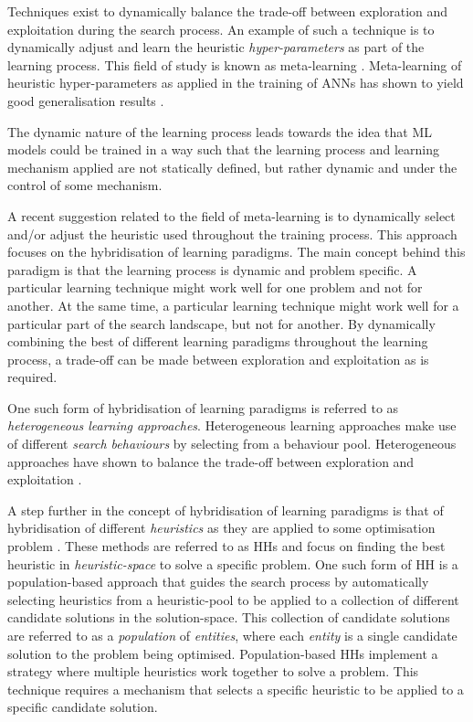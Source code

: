 Techniques exist to dynamically balance the trade-off between exploration and exploitation during the search process. An example of such a technique is to dynamically adjust and learn the heuristic \textit{hyper-parameters} as part of the learning process. This field of study is known as meta-learning \cite{ref:giraud:2004}. Meta-learning of heuristic hyper-parameters as applied in the training of \acp{ANN} has shown to yield good generalisation results \cite{ref:hospedales:2020, ref:vilalta:2002}.

The dynamic nature of the learning process leads towards the idea that \ac{ML} models could be trained in a way such that the learning process and learning mechanism applied are not statically defined, but rather dynamic and under the control of some mechanism.

A recent suggestion related to the field of meta-learning is to dynamically select and/or adjust the heuristic used throughout the training process. This approach focuses on the hybridisation of learning paradigms. The main concept behind this paradigm is that the learning process is dynamic and problem specific. A particular learning technique might work well for one problem and not for another. At the same time, a particular learning technique might work well for a particular part of the search landscape, but not for another. By dynamically combining the best of different learning paradigms throughout the learning process, a trade-off can be made between exploration and exploitation as is required.

One such form of hybridisation of learning paradigms is referred to as \textit{heterogeneous learning approaches}. Heterogeneous learning approaches make use of different \textit{search behaviours} by selecting from a behaviour pool. Heterogeneous approaches have shown to balance the trade-off between exploration and exploitation \cite{ref:nepomuceno:2013}.

A step further in the concept of hybridisation of learning paradigms is that of hybridisation of different \textit{heuristics} as they are applied to some optimisation problem \cite{ref:burke:2013}. These methods are referred to as \acfp{HH} and focus on finding the best heuristic in \textit{heuristic-space} to solve a specific problem. One such form of \ac{HH} is a population-based approach that guides the search process by automatically selecting heuristics from a heuristic-pool to be applied to a collection of different candidate solutions in the solution-space. This collection of candidate solutions are referred to as a \textit{population} of \textit{entities}, where each \textit{entity} is a single candidate solution to the problem being optimised. Population-based \acp{HH} implement a strategy where multiple heuristics work together to solve a problem. This technique requires a mechanism that selects a specific heuristic to be applied to a specific candidate solution.

